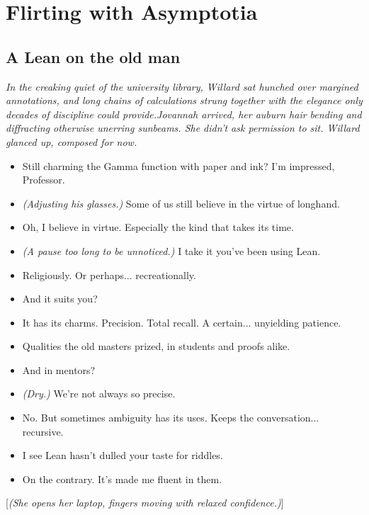 \section*{Flirting with Asymptotia}

\subsection*{A Lean on the old man}

\textit{In the creaking quiet of the university library, Willard sat hunched over margined annotations, and long chains of calculations strung together with the elegance only decades of discipline could provide.Jovannah arrived, her auburn hair bending and diffracting otherwise unerring sunbeams. She didn’t ask permission to sit. Willard glanced up, composed for now.}

\begin{itemize}
    \item[\textbf{Jovannah:}] Still charming the Gamma function with paper and ink? I'm impressed, Professor.

    \item[\textbf{Willard:}] \textit{(Adjusting his glasses.)} Some of us still believe in the virtue of longhand.

    \item[\textbf{Jovannah:}] Oh, I believe in virtue. Especially the kind that takes its time.

    \item[\textbf{Willard:}] \textit{(A pause too long to be unnoticed.)} I take it you’ve been using Lean.

    \item[\textbf{Jovannah:}] Religiously. Or perhaps... recreationally.

    \item[\textbf{Willard:}] And it suits you?

    \item[\textbf{Jovannah:}] It has its charms. Precision. Total recall. A certain... unyielding patience.

    \item[\textbf{Willard:}] Qualities the old masters prized, in students and proofs alike.

    \item[\textbf{Jovannah:}] And in mentors?

    \item[\textbf{Willard:}] \textit{(Dry.)} We’re not always so precise.

    \item[\textbf{Jovannah:}] No. But sometimes ambiguity has its uses. Keeps the conversation... recursive.

    \item[\textbf{Willard:}] I see Lean hasn’t dulled your taste for riddles.

    \item[\textbf{Jovannah:}] On the contrary. It’s made me fluent in them.
\end{itemize}
[\textit{(She opens her laptop, fingers moving with relaxed confidence.)}]

